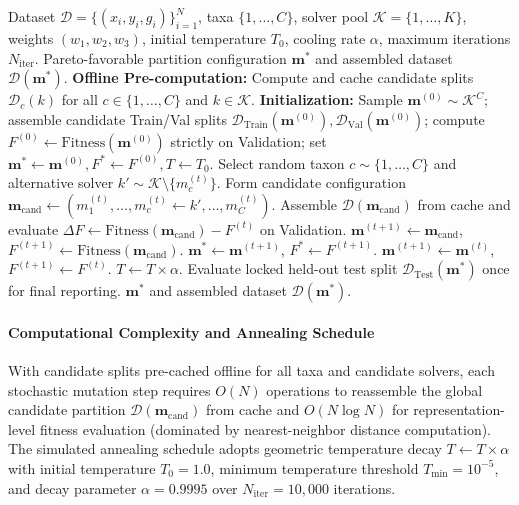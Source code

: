 \documentclass[a4paper,fleqn]{cas-sc}
\begin{document}
\begin{algorithm}[htbp]
\caption{Combinatorial Simulated Annealing Meta-Selector (CEGS-Split)}
\label{alg:cegs_split}
\begin{algorithmic}[1]
\Require Dataset $\mathcal{D} = \{(x_i, y_i, g_i)\}_{i=1}^N$, taxa $\{1,\dots,C\}$, solver pool $\mathcal{K}=\{1,\dots,K\}$, weights $(w_1, w_2, w_3)$, initial temperature $T_0$, cooling rate $\alpha$, maximum iterations $N_{\text{iter}}$.
\Ensure Pareto-favorable partition configuration $\boldsymbol{m}^*$ and assembled dataset $\mathcal{D}(\boldsymbol{m}^*)$.
\State \textbf{Offline Pre-computation:} Compute and cache candidate splits $\mathcal{D}_c(k)$ for all $c \in \{1,\dots,C\}$ and $k \in \mathcal{K}$.
\State \textbf{Initialization:} Sample $\boldsymbol{m}^{(0)} \sim \mathcal{K}^C$; assemble candidate Train/Val splits $\mathcal{D}_{\text{Train}}(\boldsymbol{m}^{(0)}), \mathcal{D}_{\text{Val}}(\boldsymbol{m}^{(0)})$; compute $F^{(0)} \gets \mathrm{Fitness}(\boldsymbol{m}^{(0)})$ strictly on Validation; set $\boldsymbol{m}^* \gets \boldsymbol{m}^{(0)}, F^* \gets F^{(0)}, T \gets T_0$.
    \State Select random taxon $c \sim \{1, \dots, C\}$ and alternative solver $k' \sim \mathcal{K} \setminus \{m_c^{(t)}\}$.
    \State Form candidate configuration $\boldsymbol{m}_{\text{cand}} \gets (m_1^{(t)}, \dots, m_c^{(t)} \gets k', \dots, m_C^{(t)})$.
    \State Assemble $\mathcal{D}(\boldsymbol{m}_{\text{cand}})$ from cache and evaluate $\Delta F \gets \mathrm{Fitness}(\boldsymbol{m}_{\text{cand}}) - F^{(t)}$ on Validation.
        \State $\boldsymbol{m}^{(t+1)} \gets \boldsymbol{m}_{\text{cand}}$, $F^{(t+1)} \gets \mathrm{Fitness}(\boldsymbol{m}_{\text{cand}})$.
            \State $\boldsymbol{m}^* \gets \boldsymbol{m}^{(t+1)}$, $F^* \gets F^{(t+1)}$.
        \EndIf
    \Else
        \State $\boldsymbol{m}^{(t+1)} \gets \boldsymbol{m}^{(t)}$, $F^{(t+1)} \gets F^{(t)}$.
    \EndIf
    \State $T \gets T \times \alpha$.
\EndFor
\State Evaluate locked held-out test split $\mathcal{D}_{\text{Test}}(\boldsymbol{m}^*)$ once for final reporting.
\State \Return $\boldsymbol{m}^*$ and assembled dataset $\mathcal{D}(\boldsymbol{m}^*)$.
\end{algorithmic}
\end{algorithm}

\paragraph{Computational Complexity and Annealing Schedule}
With candidate splits pre-cached offline for all taxa and candidate solvers, each stochastic mutation step requires $O(N)$ operations to reassemble the global candidate partition $\mathcal{D}(\boldsymbol{m}_{\text{cand}})$ from cache and $O(N \log N)$ for representation-level fitness evaluation (dominated by nearest-neighbor distance computation). The simulated annealing schedule adopts geometric temperature decay $T \gets T \times \alpha$ with initial temperature $T_0 = 1.0$, minimum temperature threshold $T_{\min} = 10^{-5}$, and decay parameter $\alpha = 0.9995$ over $N_{\text{iter}} = 10{,}000$ iterations.
\end{document}
